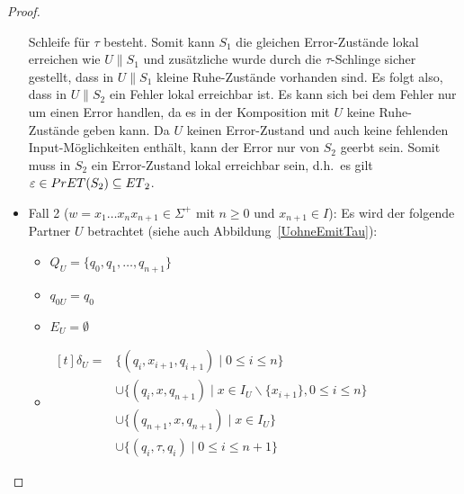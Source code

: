\begin{proof}
\begin{itemize}
      Schleife für $\tau$ besteht. Somit kann $S_1$ die gleichen Error-Zustände
      lokal erreichen wie $U\|S_1$ und zusätzliche wurde durch die
      $\tau$-Schlinge sicher gestellt, dass in $U\|S_1$ kleine Ruhe-Zustände
      vorhanden sind. Es folgt also, dass in $U\|S_2$ ein Fehler lokal
      erreichbar ist. Es kann sich bei dem Fehler nur um einen Error handlen,
      da es in der Komposition mit $U$ keine Ruhe-Zustände geben kann. Da $U$
      keinen Error-Zustand und auch keine fehlenden Input-Möglichkeiten
      enthält, kann der Error nur von $S_2$ geerbt sein. Somit muss in $S_2$
      ein Error-Zustand lokal erreichbar sein, d.h.\ es gilt $\varepsilon\in
      PrET{}(S_2)\subseteq ET{}_2$.
    \item Fall 2 ($w=x_1\dots x_nx_{n+1}\in\Sigma ^+$ mit $n\geq 0$ und
      $x_{n+1}\in I$): Es wird der folgende Partner $U$ betrachtet (siehe auch
      Abbildung~\ref{UohneEmitTau}):
      \begin{itemize}
        \item $Q_U=\{q_0,q_1,\dots ,q_{n+1}\}$
        \item $q_{0U}=q_0$
        \item $E_U=\emptyset$
        \item $\begin{aligned}[t]
            \delta _U=&\{(q_i,x_{i+1},q_{i+1})\mid  0\leq i\leq n\}\\
                      &\cup\{(q_i,x,q_{n+1})\mid  x\in I_U\backslash\{x_{i+1}\},
          0\leq i\leq n\}\\
          &\cup\{(q_{n+1},x,q_{n+1})\mid  x\in I_U\}\\
          &\cup\{(q_i,\tau,q_i)\mid 0\leq i\leq n+1\}
        \end{aligned}$
      \end{itemize}
      \begin{figure} [h!tbp]
      \begin{center}
\end{center}
\end{figure}
\end{itemize}
\end{proof}

